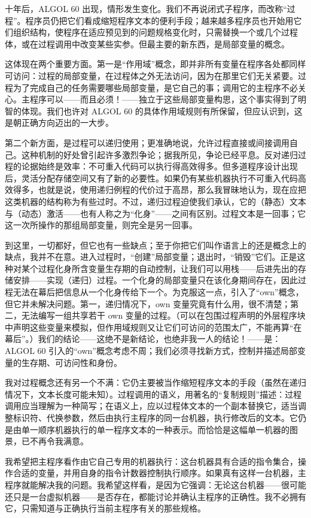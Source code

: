 \documentclass[twoside,11pt,fontset=none]{ctexbook}
\begin{document}
十年后，ALGOL 60 出现，情形发生变化。我们不再说闭式子程序，而改称“过程”。程序员仍把它们看成缩短程序文本的便利手段；越来越多程序员也开始用它们组织结构，使程序在适应预见到的问题规格变化时，只需替换一个或几个过程体，或在过程调用中改变某些实参。但最主要的新东西，是局部变量的概念。

这体现在两个重要方面。第一是“作用域”概念，即并非所有变量在程序各处都同样可访问：过程的局部变量，在过程体之外无法访问，因为在那里它们无关紧要。过程为了完成自己的任务需要哪些局部变量，是它自己的事；调用它的主程序不必关心。主程序可以——而且必须！——独立于这些局部变量构思，这个事实得到了明智的体现。我们也许对 ALGOL 60 的具体作用域规则有所保留，但应认识到，这是朝正确方向迈出的一大步。

第二个新方面，是过程可以递归使用；更准确地说，允许过程直接或间接调用自己。这种机制的好处曾引起许多激烈争论；据我所见，争论已经平息。反对递归过程的论据始终是效率：不可重入代码可以执行得高效得多。但多道程序设计出现后，灵活分配存储空间又有了新的必要性。如果仍有某些机器执行不可重入代码高效得多，也就是说，使用递归例程的代价过于高昂，那么我冒昧地认为，现在应把这类机器的结构称为有些过时。不过，递归过程迫使我们承认，它的（静态）文本与（动态）激活——也有人称之为“化身”——之间有区别。过程文本是一回事；它这一次所操作的那组局部变量，则完全是另一回事。

到这里，一切都好，但它也有一些缺点；至于你把它们叫作语言上的还是概念上的缺点，我并不在意。进入过程时，“创建”局部变量；退出时，“销毁”它们。正是这种对某个过程化身所含变量生存期的自动控制，让我们可以用栈——后进先出的存储安排——实现（递归）过程。一个化身的局部变量只在该化身期间存在，因此过程无法在幕后把信息从一个化身传给下一个。为克服这一点，引入了“own”概念，但它并未解决问题。第一，递归情况下，own 变量究竟有什么用，很不清楚；第二，无法编写一组共享若干 own 变量的过程。（可以在包围过程声明的外层程序块中声明这些变量来模拟，但作用域规则又让它们可访问的范围太广，不能再算“在幕后”。）我们的结论——这绝不是新结论，也绝非我一人的结论！——是：ALGOL 60 引入的“own”概念考虑不周；我们必须寻找新方式，控制并描述局部变量的生存期、可访问性和身份。

我对过程概念还有另一个不满：它仍主要被当作缩短程序文本的手段（虽然在递归情况下，文本长度可能未知）。过程调用的语义，用著名的“复制规则”描述：过程调用应当理解为一种简写；在语义上，应以过程体文本的一个副本替换它，适当调整标识符、代换参数，然后由执行主程序的同一台机器，执行修改后的文本。它仍是由单一顺序机器执行的单一程序文本的一种表示。而恰恰是这幅单一机器的图景，已不再令我满意。

我希望把主程序看作由它自己专用的机器执行：这台机器具有合适的指令集合，操作合适的变量，并用自身的指令计数器控制执行顺序。如果真有这样一台机器，主程序就能解决我的问题。我希望这样看，是因为它强调：无论这台机器——很可能还只是一台虚拟机器——是否存在，都能讨论并确认主程序的正确性。我不必拥有它，只需知道与正确执行当前主程序有关的那些规格。
\end{document}
